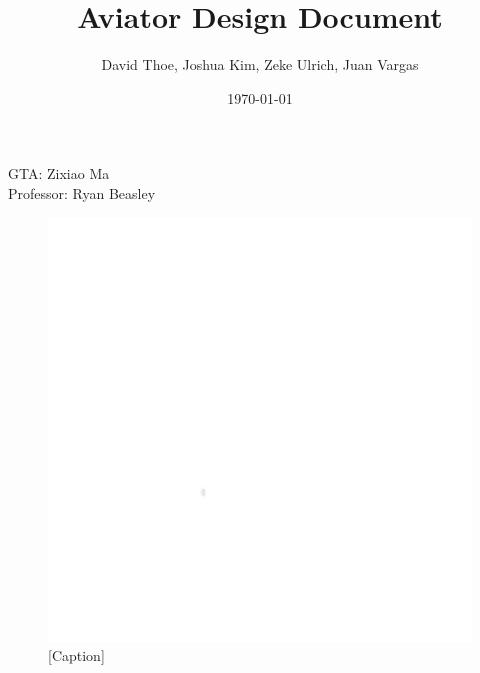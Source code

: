 \documentclass[letterpaper, 11pt]{article}
\begin{document}

\title{Aviator Design Document}
\author{David Thoe, Joshua Kim, Zeke Ulrich, Juan Vargas}
\date{\today}
\maketitle

\begin{center}
    GTA: Zixiao Ma \\
    Professor: Ryan Beasley
\end{center}

\begin{figure}[h]
    \centering
    \includegraphics[width=12cm,scale=1]{images/white.png}
    \caption{[Caption]}
\end{figure}


\clearpage
\tableofcontents %

\clearpage
\listoffigures %

\clearpage
\listoftables %
\end{document}
